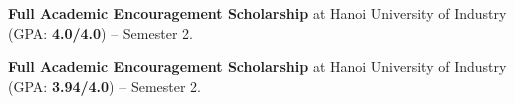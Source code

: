 \begin{cvempty} %
  \begin{cvitems} %
    \item {\textbf{Full Academic Encouragement Scholarship} at Hanoi University of Industry (GPA: \textbf{4.0/4.0}) -- Semester 2.\hfill{}}
    \item {\textbf{Full Academic Encouragement Scholarship} at Hanoi University of Industry (GPA: \textbf{3.94/4.0}) -- Semester 2.\hfill{}}
  \end{cvitems}

\end{cvempty}
